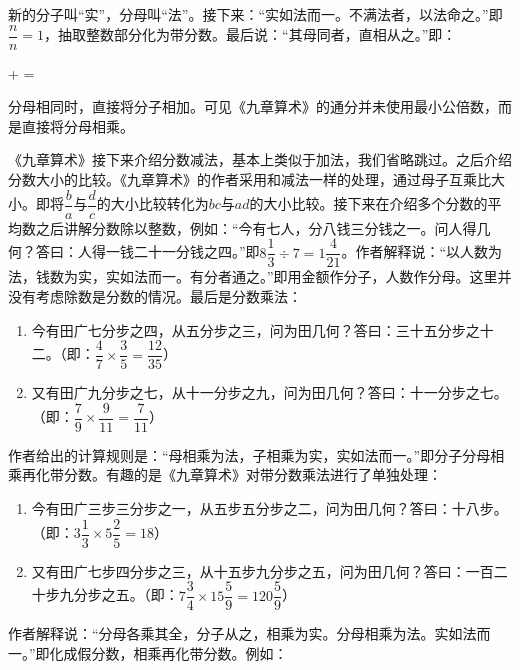 \documentclass[b5paper]{ctexart}
\begin{document}
新的分子叫“实”，分母叫“法”。接下来：“实如法而一。不满法者，以法命之。”即$\dfrac{n}{n} = 1$，抽取整数部分化为带分数。最后说：“其母同者，直相从之。”即：

\be
{} +  = 
\ee

分母相同时，直接将分子相加。可见《九章算术》的通分并未使用最小公倍数，而是直接将分母相乘。

《九章算术》接下来介绍分数减法，基本上类似于加法，我们省略跳过。之后介绍分数大小的比较。《九章算术》的作者采用和减法一样的处理，通过母子互乘比大小。即将$\dfrac{b}{a}$与$\dfrac{d}{c}$的大小比较转化为$bc$与$ad$的大小比较。接下来在介绍多个分数的平均数之后讲解分数除以整数，例如：“今有七人，分八钱三分钱之一。问人得几何？答曰：人得一钱二十一分钱之四。”即$8\dfrac{1}{3} \div 7 = 1\dfrac{4}{21}$。作者解释说：“以人数为法，钱数为实，实如法而一。有分者通之。”即用金额作分子，人数作分母。这里并没有考虑除数是分数的情况。最后是分数乘法：

\begin{enumerate}[1)]
\item 今有田广七分步之四，从五分步之三，问为田几何？答曰：三十五分步之十二。（即：$\dfrac{4}{7} \times \dfrac{3}{5} = \dfrac{12}{35}$）
\item 又有田广九分步之七，从十一分步之九，问为田几何？答曰：十一分步之七。（即：$\dfrac{7}{9} \times \dfrac{9}{11} = \dfrac{7}{11}$）
\end{enumerate}

作者给出的计算规则是：“母相乘为法，子相乘为实，实如法而一。”即分子分母相乘再化带分数。有趣的是《九章算术》对带分数乘法进行了单独处理：

\begin{enumerate}[1)]
\item 今有田广三步三分步之一，从五步五分步之二，问为田几何？答曰：十八步。（即：$3\dfrac{1}{3} \times 5\dfrac{2}{5} = 18$）
\item 又有田广七步四分步之三，从十五步九分步之五，问为田几何？答曰：一百二十步九分步之五。（即：$7\dfrac{3}{4} \times 15\dfrac{5}{9} = 120\dfrac{5}{9}$）
\end{enumerate}

作者解释说：“分母各乘其全，分子从之，相乘为实。分母相乘为法。实如法而一。”即化成假分数，相乘再化带分数。例如：
\end{document}
